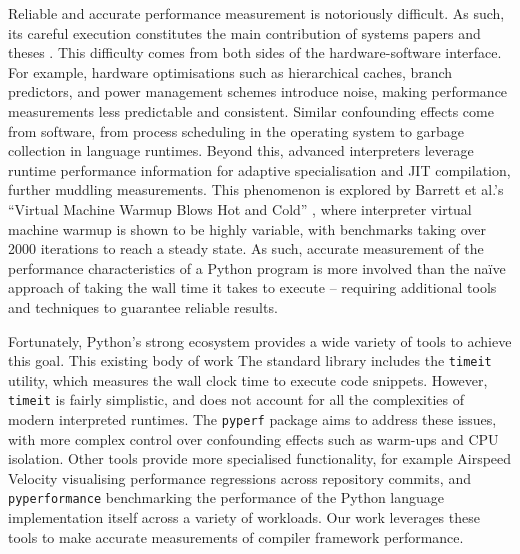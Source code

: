 Reliable and accurate performance measurement is notoriously difficult.
As such, its careful execution constitutes the main contribution of systems papers and theses \cite{crapeperformance} \cite{harris2021understanding}.
This difficulty comes from both sides of the hardware-software interface.
For example, hardware optimisations such as hierarchical caches, branch predictors, and power management schemes introduce noise, making performance measurements less predictable and consistent. Similar confounding effects come from software, from process scheduling in the operating system to garbage collection in language runtimes.
Beyond this, advanced interpreters leverage runtime performance information for adaptive specialisation and JIT compilation, further muddling measurements. This phenomenon is explored by Barrett et al.'s ``Virtual Machine Warmup Blows Hot and Cold'' \cite{barrettVirtualMachineWarmup2017}, where interpreter virtual machine warmup is shown to be highly variable, with benchmarks taking over 2000 iterations to reach a steady state.
As such, accurate measurement of the performance characteristics of a Python program is more involved than the na\"ive approach of taking the wall time it takes to execute -- requiring additional tools and techniques to guarantee reliable results.

Fortunately, Python's strong ecosystem provides a wide variety of tools to achieve this goal.
This existing body of work
The standard library includes the \texttt{timeit} utility, which measures the wall clock time to execute code snippets. However, \texttt{timeit} is fairly simplistic, and does not account for all the complexities of modern interpreted runtimes.
The \texttt{pyperf} \cite{victorstinnerPsfPyperf2025} package aims to address these issues, with more complex control over confounding effects such as warm-ups and CPU isolation.
Other tools provide more specialised functionality, for example Airspeed Velocity \cite{michaeldroettboomAirspeedvelocityAsv2025} visualising performance regressions across repository commits, and \texttt{pyperformance} \cite{collinwinterPythonPyperformance2025} benchmarking the performance of the Python language implementation itself across a variety of workloads.
Our work leverages these tools to make accurate measurements of compiler framework performance.

